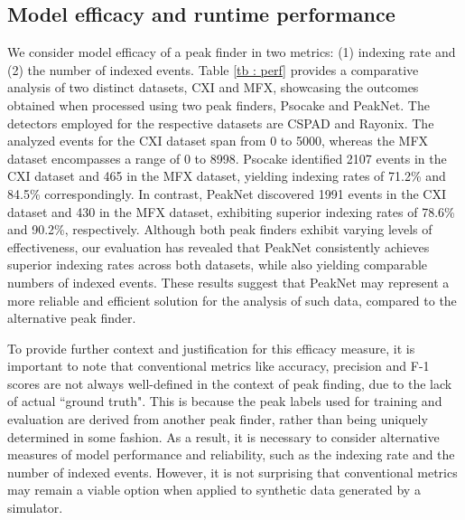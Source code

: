 \documentclass[conference]{IEEEtran}
\newcommand{\peaknet}{PeakNet}
\newcommand{\psocake}{Psocake}
\begin{document}
\subsection{Model efficacy and runtime performance}

We consider model efficacy of a peak finder in two metrics: (1) indexing rate
and (2) the number of indexed events.  Table \ref{tb : perf} provides a
comparative analysis of two distinct datasets, CXI and MFX, showcasing the
outcomes obtained when processed using two peak finders, \psocake{} and
\peaknet{}.  The detectors employed for the respective datasets are CSPAD and
Rayonix.  The analyzed events for the CXI dataset span from 0 to 5000, whereas
the MFX dataset encompasses a range of 0 to 8998.  \psocake{} identified 2107
events in the CXI dataset and 465 in the MFX dataset, yielding indexing rates of
71.2\% and 84.5\% correspondingly.  In contrast, \peaknet{} discovered 1991
events in the CXI dataset and 430 in the MFX dataset, exhibiting superior
indexing rates of 78.6\% and 90.2\%, respectively.  Although both peak finders
exhibit varying levels of effectiveness, our evaluation has revealed that
\peaknet{} consistently achieves superior indexing rates across both datasets,
while also yielding comparable numbers of indexed events.  These results suggest
that \peaknet{} may represent a more reliable and efficient solution for the
analysis of such data, compared to the alternative peak finder.

To provide further context and justification for this efficacy measure, it is
important to note that conventional metrics like accuracy, precision and F-1
scores are not always well-defined in the context of peak finding, due to the
lack of actual ``ground truth".  This is because the peak labels used for
training and evaluation are derived from another peak finder, rather than being
uniquely determined in some fashion.  As a result, it is necessary to consider
alternative measures of model performance and reliability, such as the indexing
rate and the number of indexed events.  However, it is not surprising that
conventional metrics may remain a viable option when applied to synthetic data
generated by a simulator.
\end{document}
